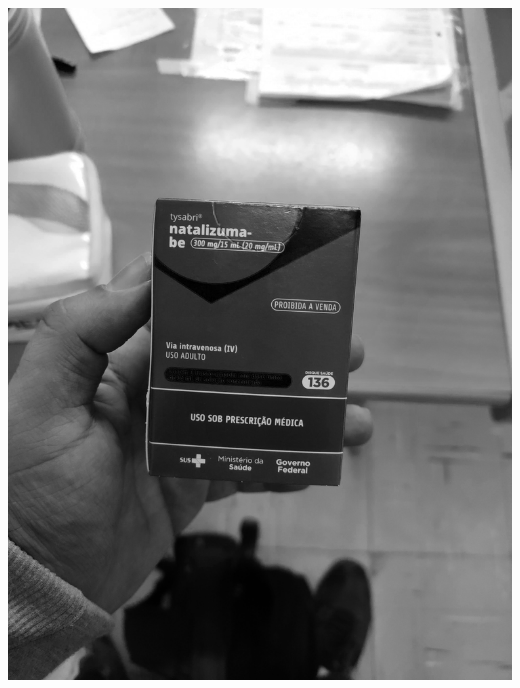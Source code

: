 \begin{frame}
\begin{columns}
\begin{column}{0.24\textwidth}
			\includegraphics[height=0.35\textheight]{../pictures/tysabri_rgb_b_only.jpg}
			\\\vspace{\floatsep}

\end{column}
\end{columns}
\end{frame}
